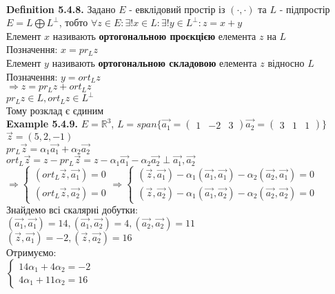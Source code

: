 \documentclass[a4paper, 14pt]{extarticle}
\def\defin#1{\textbf{Definition {#1}}}
\def\ex#1{\textbf{Example {#1}}}
\def\bigline{\vspace{5mm}\\}
\begin{document}
\bigline
\defin{5.4.8.} Задано $E$ - евклідовий простір із $(\cdot, \cdot)$ та $L$ - підпростір\\
$E = L \bigoplus L^{\perp}$, тобто $\forall z \in E: \exists! x \in L: \exists! y \in L^{\perp}: z = x+y$\\
Елемент $x$ називають \textbf{ортогональною проєкцією} елемента $z$ на $L$\\
Позначення: $x = pr_L z$\\
Елемент $y$ називають \textbf{ортогональною складовою} елемента $z$ відносно $L$\\
Позначення: $y = ort_L z$\\
$\Rightarrow z = pr_L z + ort_L z$\\
$pr_L z \in L, ort_L z \in L^{\perp}$\\
Тому розклад є єдиним \bigline
\ex{5.4.9.} $E = \mathbb{R}^3$, $L = span\{\vec{a_1} = \begin{pmatrix} 1 & -2 & 3 \end{pmatrix} \vec{a_2} = \begin{pmatrix} 3 & 1 & 1 \end{pmatrix} \}$\\
$\vec{z} = (5,2,-1)$\\
$pr_{L} \vec{z} = \alpha_1 \vec{a_1} + \alpha_2 \vec{a_2}$\\
$ort_L \vec{z} = z - pr_L \vec{z} = z - \alpha_1 \vec{a_1} - \alpha_2 \vec{a_2} \perp \vec{a_1}, \vec{a_2}$\\
$\Rightarrow \begin{cases} (ort_L \vec{z}, \vec{a_1}) = 0 \\ (ort_L \vec{z}, \vec{a_2}) = 0 \end{cases} \Rightarrow \begin{cases} (\vec{z}, \vec{a_1}) - \alpha_1 (\vec{a_1},\vec{a_1}) - \alpha_2 (\vec{a_2}, \vec{a_1}) = 0 \\ (\vec{z}, \vec{a_2}) - \alpha_1 (\vec{a_1},\vec{a_2}) - \alpha_2 (\vec{a_2}, \vec{a_2}) = 0 \end{cases}$\\
Знайдемо всі скалярні добутки:\\
$(\vec{a_1}, \vec{a_1}) = 14, (\vec{a_1}, \vec{a_2}) = 4, (\vec{a_2}, \vec{a_2}) = 11$\\
$(\vec{z}, \vec{a_1}) = -2, (\vec{z},\vec{a_2}) = 16$\\
Отримуємо:\\
$\begin{cases} 14 \alpha_1 + 4 \alpha_2 = -2 \\ 4 \alpha_1 + 11 \alpha_2 = 16 \end{cases}$\\
\end{document}
